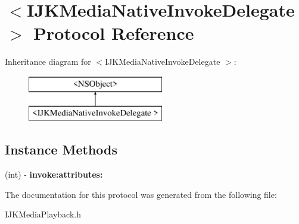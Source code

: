 \hypertarget{protocol_i_j_k_media_native_invoke_delegate_01-p}{}\section{$<$I\+J\+K\+Media\+Native\+Invoke\+Delegate $>$ Protocol Reference}
\label{protocol_i_j_k_media_native_invoke_delegate_01-p}
Inheritance diagram for $<$I\+J\+K\+Media\+Native\+Invoke\+Delegate $>$\+:\begin{figure}[H]
\begin{center}
\leavevmode
\includegraphics[height=2.000000cm]{protocol_i_j_k_media_native_invoke_delegate_01-p}
\end{center}
\end{figure}
\subsection*{Instance Methods}
\begin{DoxyCompactItemize}
\item 
\mbox{\label{protocol_i_j_k_media_native_invoke_delegate_01-p_a7e88e4e115c899a5d26999cd46e99d21}} 
(int) -\/ {\bfseries invoke\+:attributes\+:}
\end{DoxyCompactItemize}


The documentation for this protocol was generated from the following file\+:\begin{DoxyCompactItemize}
\item 
I\+J\+K\+Media\+Playback.\+h\end{DoxyCompactItemize}
